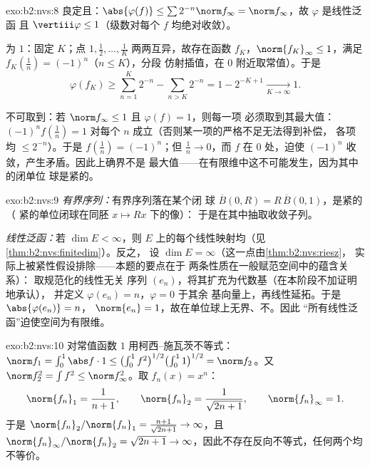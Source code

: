 \begin{solution}{exo:b2:nvs:8}
良定且：$\abs{\varphi(f)} \leq \sum 2^{-n}
\norm f_\infty = \norm f_\infty$，故 $\varphi$ 是线性泛函
且 $\vertiii\varphi \leq 1$（级数对每个
$f$ 均绝对收敛）。

为 $1$：固定 $K$；点 $1, \frac12, \dots, \frac1K$
两两互异，故存在函数 $f_K$，$\norm{f_K}_\infty
\leq 1$，满足 $f_K(\frac1n) = (-1)^n$（$n \leq K$），分段
仿射插值，在 $0$ 附近取常值）。于是
\[
\varphi(f_K) \geq \sum_{n=1}^{K} 2^{-n} - \sum_{n > K} 2^{-n}
= 1 - 2^{-K+1} \xrightarrow[K \to \infty]{} 1 .
\]

不可取到：若 $\norm f_\infty \leq 1$ 且 $\varphi(f) = 1$，则每一项
必须取到其最大值：$(-1)^n f(\frac1n) = 1$ 对每个
$n$ 成立（否则某一项的严格不足无法得到补偿，
各项均 $\leq 2^{-n}$）。于是 $f(\frac1n) = (-1)^n$；但
$\frac1n \to 0$，而 $f$ 在 $0$ 处，迫使
$(-1)^n$ 收敛，产生矛盾。因此上确界不是
最大值——在有限维中这不可能发生，因为其中的闭单位
球是紧的。
\end{solution}

\begin{solution}{exo:b2:nvs:9}
\emph{有界序列：}有界序列落在某个闭
球 $\overline B(0, R) = R\,\overline B(0,1)$，是紧的（
紧的单位闭球在同胚 $x \mapsto Rx$ 下的像）：
于是在其中抽取收敛子列。

\emph{线性泛函：}若 $\dim E < \infty$，则
$E$ 上的每个线性映射均（见\cref{thm:b2:nvs:finitedim}）。反之，
设 $\dim E = \infty$（这一点由\cref{thm:b2:nvs:riesz}，
实际上被紧性假设排除——本题的要点在于
两条性质在一般赋范空间中的蕴含关系）：
取规范化的线性无关
序列 $(e_n)$，将其扩充为代数基（在本阶段不加证明地承认），
并定义 $\varphi(e_n) = n$，$\varphi = 0$ 于其余
基向量上，再线性延拓。于是 $\abs{\varphi(e_n)} = n$，
$\norm{e_n} = 1$，故在单位球上无界、不。因此
“所有线性泛函”迫使空间为有限维。
\end{solution}

\begin{solution}{exo:b2:nvs:10}
对常值函数 $1$ 用柯西–施瓦茨不等式：$\norm f_1 =
\int_0^1 \abs f\cdot 1 \leq \bigl(\int_0^1
f^2\bigr)^{1/2}\bigl(\int_0^1 1\bigr)^{1/2} = \norm f_2$。又
$\norm f_2^2 = \int f^2 \leq \norm f_\infty^2$。取 $f_n(x) =
x^n$：
\[
\norm{f_n}_1 = \frac1{n+1}, \qquad
\norm{f_n}_2 = \frac1{\sqrt{2n+1}}, \qquad
\norm{f_n}_\infty = 1 .
\]
于是 $\norm{f_n}_2/\norm{f_n}_1 = \frac{n+1}{\sqrt{2n+1}} \to
\infty$，且 $\norm{f_n}_\infty/\norm{f_n}_2 = \sqrt{2n+1} \to
\infty$，因此不存在反向不等式，任何两个均不等价。
\end{solution}

